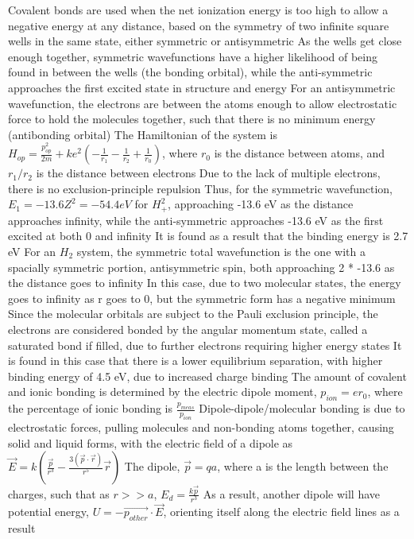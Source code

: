 \documentclass[11 pt, twoside]{article}
\newenvironment{outline*}
{
	\begin{outline}[enumerate]
	}
	{\end{outline}
}
\begin{document}
\begin{outline*}
\1 Covalent bonds are used when the net ionization energy is too high to allow a negative energy at any distance, based on the symmetry of two infinite square wells in the same state, either symmetric or antisymmetric
	\2 As the wells get close enough together, symmetric wavefunctions have a higher likelihood of being found in between the wells (the bonding orbital), while the anti-symmetric approaches the first excited state in structure and energy
		\3 For an antisymmetric wavefunction, the electrons are between the atoms enough to allow electrostatic force to hold the molecules together, such that there is no minimum energy (antibonding orbital)
	\2 The Hamiltonian of the system is $H_{op} = \frac{p_{op}^2}{2m} + ke^2(-\frac{1}{r_1} - \frac{1}{r_2} + \frac{1}{r_0})$, where $r_0$ is the distance between atoms, and $r_1/r_2$ is the distance between electrons
		\3 Due to the lack of multiple electrons, there is no exclusion-principle repulsion
		\3 Thus, for the symmetric wavefunction, $E_1 = -13.6 Z^2 = -54.4 eV$ for $H^2_+$, approaching -13.6 eV as the distance approaches infinity, while the anti-symmetric approaches -13.6 eV as the first excited at both 0 and infinity
		\3 It is found as a result that the binding energy is 2.7 eV
	\2 For an $H_2$ system, the symmetric total wavefunction is the one with a spacially symmetric portion, antisymmetric spin, both approaching 2 * -13.6 as the distance goes to infinity
		\3 In this case, due to two molecular states, the energy goes to infinity as r goes to 0, but the symmetric form has a negative minimum
		\3 Since the molecular orbitals are subject to the Pauli exclusion principle, the electrons are considered bonded by the angular momentum state, called a saturated bond if filled, due to further electrons requiring higher energy states
		\3 It is found in this case that there is a lower equilibrium separation, with higher binding energy of 4.5 eV, due to increased charge binding
	\2 The amount of covalent and ionic bonding is determined by the electric dipole moment, $p_{ion} = er_0$, where the percentage of ionic bonding is $\frac{p_{meas}}{p_{ion}}$
\1 Dipole-dipole/molecular bonding is due to electrostatic forces, pulling molecules and non-bonding atoms together, causing solid and liquid forms, with the electric field of a dipole as $\vec{E} = k(\frac{\vec{p}}{r^3} - \frac{3(\vec{p} \cdot \vec{r})}{r^5}\vec{r})$
	\2 The dipole, $\vec{p} = qa$, where a is the length between the charges, such that as $r >> a$, $E_d = \frac{k\vec{p}}{r^3}$
	\2 As a result, another dipole will have potential energy, $U = -\vec{p_{other}} \cdot \vec{E}$, orienting itself along the electric field lines as a result

\end{outline*}
\end{document}
